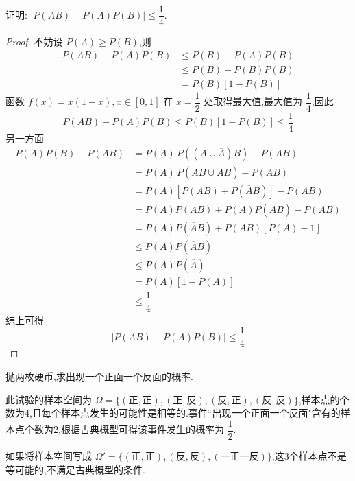 \question 证明: $|P(AB) - P(A) P(B)| \leqslant \dfrac{1}{4}$.

\begin{proof}
    不妨设 $P(A) \geqslant P(B)$,则
    $$
    \begin{aligned}
        P(AB) - P(A) P(B) & \leqslant P(B) - P(A) P(B) \\
        & \leqslant P(B) - P(B) P(B) \\
        &= P(B) [1 - P(B)]
    \end{aligned}
    $$
    函数 $f(x) = x(1-x), x \in [0,1]$ 在 $x = \dfrac{1}{2}$ 处取得最大值,最大值为 $\dfrac{1}{4}$,因此
    $$
    P(AB) - P(A) P(B) \leqslant P(B) [1 - P(B)] \leqslant \dfrac{1}{4}
    $$
    另一方面
    $$
    \begin{aligned}
        P(A) P(B) - P(AB) &= P(A) \, P((A \cup \overline{A}) B) - P(AB) \\
        &= P(A) \, P(AB \cup \overline{A} B) - P(AB) \\
        &= P(A) [P(AB) + P(\overline{A} B)] - P(AB) \\
        &= P(A) P(AB) + P(A) P(\overline{A} B) - P(AB) \\
        &= P(A) P(\overline{A} B) + P(AB) [P(A) - 1] \\
        & \leqslant P(A) P(\overline{A} B) \\
        & \leqslant P(A) P(\overline{A}) \\
        &= P(A) [1 - P(A)] \\
        & \leqslant \dfrac{1}{4}
    \end{aligned}
    $$
    综上可得
    $$
    |P(AB) - P(A) P(B)| \leqslant \dfrac{1}{4}
    $$
\end{proof}


\question 抛两枚硬币,求出现一个正面一个反面的概率.

\begin{solution}
    此试验的样本空间为 $\varOmega = \{ (\text{正}, \text{正}), (\text{正}, \text{反}), (\text{反}, \text{正}), (\text{反}, \text{反}) \}$,样本点的个数为4,且每个样本点发生的可能性是相等的.事件``出现一个正面一个反面"含有的样本点个数为2,根据古典概型可得该事件发生的概率为 $\dfrac{1}{2}$.
\end{solution}

\begin{note}
    \indent 如果将样本空间写成 $\varOmega' = \{ (\text{正}, \text{正}), (\text{反}, \text{反}), (\text{一正一反}) \}$,这3个样本点不是等可能的,不满足古典概型的条件.
\end{note}

